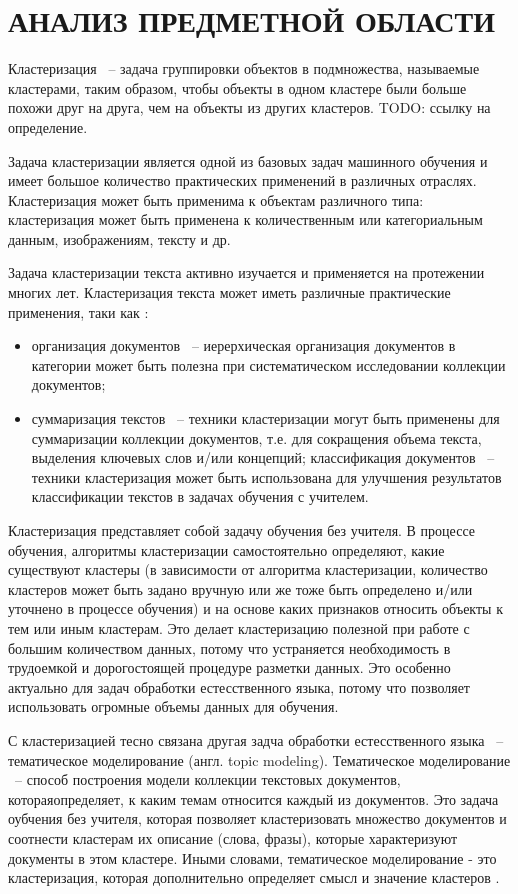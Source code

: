 \chapter{АНАЛИЗ ПРЕДМЕТНОЙ ОБЛАСТИ}
\aftertitle

Кластеризация ~-- задача группировки объектов в подмножества, называемые кластерами, таким образом, чтобы объекты в одном кластере были больше похожи друг на друга, чем на объекты из других кластеров. TODO: ссылку на определение.

Задача кластеризации является одной из базовых задач машинного обучения и имеет большое количество практических применений в различных отраслях. Кластеризация может быть применима к объектам различного типа: кластеризация может быть применена к количественным или категориальным данным, изображениям, тексту и др.

Задача кластеризации текста активно изучается и применяется на протежении многих лет. Кластеризация текста может иметь различные практические применения, таки как \cite{text-clustering-survey}:
\begin{itemize}
    \item организация документов ~-- иерерхическая организация документов в категории может быть полезна при систематическом исследовании коллекции документов;
    \item суммаризация текстов ~-- техники кластеризации могут быть применены для суммаризации коллекции документов, т.е. для сокращения объема текста, выделения ключевых слов и/или концепций;
     классификация документов ~-- техники кластеризация может быть использована для улучшения результатов классификации текстов в задачах обучения с учителем.
\end{itemize}

Кластеризация представляет собой задачу обучения без учителя. В процессе обучения, алгоритмы кластеризации самостоятельно определяют, какие существуют кластеры (в зависимости от алгоритма кластеризации, количество кластеров может быть задано вручную или же тоже быть определено и/или уточнено в процессе обучения) и на основе каких признаков относить объекты к тем или иным кластерам. Это делает кластеризацию полезной при работе с большим количеством данных, потому что устраняется необходимость в трудоемкой и дорогостоящей процедуре разметки данных. Это особенно актуально для задач обработки естесственного языка, потому что позволяет использовать огромные объемы данных для обучения.

С кластеризацией тесно связана другая задча обработки естесственного языка ~-- тематическое моделирование (англ. topic modeling). Тематическое моделирование ~-- способ построения модели коллекции текстовых документов, котораяопределяет, к каким темам относится каждый из документов. Это задача оубчения без учителя, которая позволяет кластеризовать множество документов и соотнести кластерам их описание (слова, фразы), которые характеризуют документы в этом кластере. Иными словами, тематическое моделирование - это кластеризация, которая дополнительно определяет смысл и значение кластеров \cite{no-patterns}.


